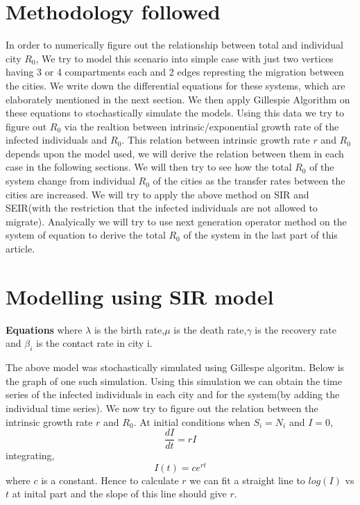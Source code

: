 \documentclass{article}
\begin{document}
\section{Methodology followed}
In order to numerically figure out the relationship between total and
individual city $R_{0}$, We try to model this scenario into simple
case with just two vertices having 3 or 4 compartments each and 2
edges represting the migration between the cities. We write down the
differential equations for these systems, which are elaborately
mentioned in the next section. We then apply Gillespie Algorithm on
these equations to stochastically simulate the models. Using this data
we try to figure out $R_{0}$ via the realtion between
intrinsic/exponential growth rate of the infected individuals and
$R_{0}$. This relation between intrinsic growth rate $r$ and $R_{0}$
depends upon the model used, we will derive the relation between them
in each case in the following sections. We will then try to see how
the total $R_{0}$ of the system change from individual $R_{0}$ of the
cities as the transfer rates between the cities are increased.  We
will try to apply the above method on SIR and SEIR(with the
restriction that the infected individuals are not allowed to migrate).
Analyically we will try to use next generation operator method on the
system of equation to derive the total $R_{0}$ of the system in the
last part of this article.
\section{Modelling using SIR model}
\textbf{Equations} \newline
where $\lambda$ is the birth rate,$\mu$ is the death rate,$\gamma$ is
the recovery rate and $\beta_{i}$ is the contact rate in city i. \newline

The above model was stochastically simulated using Gillespe
algoritm. Below is the graph of one such simulation.
Using this simulation we can obtain the time series of the infected
individuals in each city and for the system(by adding the individual
time series). We now try to figure out the relation between the
intrinsic growth rate $r$ and $R_{0}$. At initial conditions when
$S_{i}=N_{i}$ and $I=0$, $$\frac{dI}{dt}=rI$$
integrating, $$I(t)=ce^{rt}$$ where $c$ is a constant. Hence to
calculate $r$ we can fit a straight line to $log(I)$ vs $t$ at inital
part and the slope of this line should give $r$.
\end{document}
